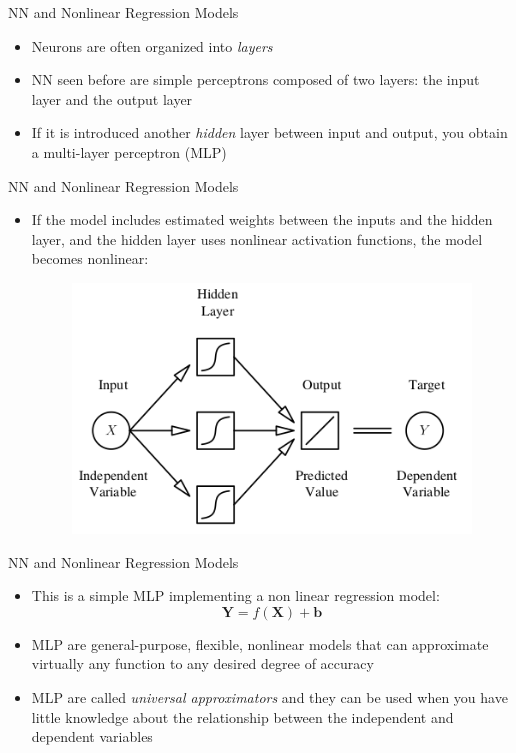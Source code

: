 \documentclass[xcolor ={table,usenames,dvipsnames}]{beamer}
\theoremstyle{definition}
\begin{document}
\begin{frame}{NN and Nonlinear Regression Models}
\begin{itemize}
	\item Neurons are often organized into \emph{layers}
	\item NN seen before are simple perceptrons composed of two layers: the input layer and the output layer
	\item If it is introduced another \emph{hidden} layer between input and output, you obtain a multi-layer perceptron (MLP)
\end{itemize}
\end{frame}
\begin{frame}{NN and Nonlinear Regression Models}
\begin{itemize}
	\item 
	If the model includes estimated weights between the inputs and the hidden layer, and the hidden layer uses nonlinear activation functions, the model becomes nonlinear:
	\begin{figure}[h!]
		\centering
		\includegraphics[scale=2]{../Relazione/img/nonlinreg}
	\end{figure}
\end{itemize}
\end{frame}
\begin{frame}{NN and Nonlinear Regression Models}
\begin{itemize}
	\item This is a simple MLP implementing a non linear regression model:
	$$
	\textbf{Y} = f(\textbf{X}) + \textbf{b}
	$$
	\item MLP are general-purpose, flexible, nonlinear models that can approximate
	virtually any function to any desired degree of accuracy
	\item MLP are called \emph{universal approximators} and they can be used when you have little knowledge about the relationship between the independent and dependent variables
\end{itemize}
\end{frame}
\end{document}
